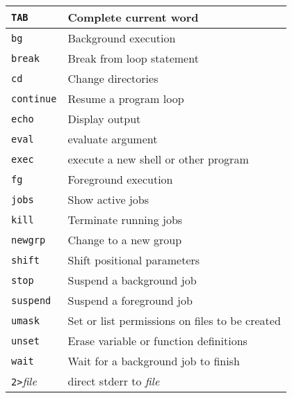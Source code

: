 \documentclass{article}
\begin{document}
\begin{center}
\begin{tabular}{|l|l|}
  \hline
  \texttt{TAB} & 		Complete current word\\
  \hline
  \texttt{bg} & 	Background execution\\
  \hline	
  \texttt{break} & 	Break from loop statement\\
  \hline
  \texttt{cd} & 		Change directories\\
  \hline
  \texttt{continue} & 		Resume a program loop\\
  \hline
  \texttt{echo} &			Display output\\
  \hline
  \texttt{eval} &			evaluate argument\\
  \hline
  \texttt{exec} &			execute a new shell or other program\\
  \hline
  \texttt{fg} &			Foreground execution\\
  \hline		
  \texttt{jobs} &			Show active jobs\\
  \hline
  \texttt{kill} 	&		Terminate running jobs\\
  \hline
  \texttt{newgrp} 	&		Change to a new group\\
  \hline
  \texttt{shift} 	&		Shift positional parameters\\
  \hline
  \texttt{stop} 	&		Suspend a background job\\
  \hline	
  \texttt{suspend} 	&		Suspend a foreground job\\
  \hline
  \texttt{umask} 	&		Set or list permissions on files to be created\\
  \hline
  \texttt{unset} 	&		Erase variable or function definitions\\
  \hline
  \texttt{wait} 	&		Wait for a background job to finish\\
  \hline
  \texttt{2>}\textsl{file} 	&		direct stderr to \textsl{file} \\
  \hline

\end{tabular}
\end{center}
\end{document}
